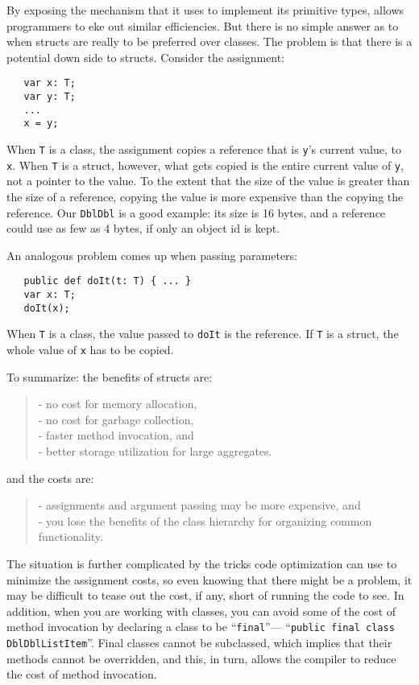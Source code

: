 By exposing the mechanism that it uses to implement
its primitive types, \Xten{} allows programmers to eke out similar
efficiencies.  But there is no simple answer as to when structs are really
to be preferred over classes.  The problem is that there is a potential down
side to structs.  Consider the assignment: 
\begin{verbatim}
   var x: T;
   var y: T;
   ...
   x = y;
\end{verbatim}
When {\tt T} is a class, the assignment copies a reference that is {\tt y}'s
current value, to {\tt x}.  When {\tt T} is a struct, however, what gets copied
is the entire current value of {\tt y}, not a pointer to the value.  To the
extent that the  size of the value is greater than the size of a reference,
copying the value is more expensive than the copying the reference.
Our {\tt DblDbl} is a good example: its size is 16 bytes, and a reference
could use as few as 4 bytes, if only an object id is kept.

An analogous problem comes up when passing parameters:
\begin{verbatim}
   public def doIt(t: T) { ... }
   var x: T;
   doIt(x);
\end{verbatim}
When {\tt T} is a class, the value passed to {\tt doIt} is the reference.  If
{\tt T} is a struct, the whole value of {\tt x} has to be copied.
 
To summarize: the benefits of structs are:
\begin{quote}
- no cost for memory allocation,\\
- no cost for garbage collection,\\
- faster method invocation, and\\
- better storage utilization for large aggregates.
\end{quote}
and the costs are:
\begin{quote}
- assignments and argument passing may be more expensive, and\\
- you lose the benefits of the class hierarchy for organizing common
functionality.
\end{quote}  

The situation is further complicated by the tricks code optimization can use to
minimize the assignment costs, so even knowing that there might be a problem, it
may be difficult to tease out the cost, if any, short of running the code to
see. In addition, when you are working with classes, you can avoid some of the
cost of method invocation by declaring a class to be ``{\tt final}''---\eg{}
``{\tt public final class DblDblListItem}''.  Final classes cannot be
subclassed, which implies that their methods cannot be overridden, and this, in
turn, allows the compiler to reduce the cost of method invocation.
